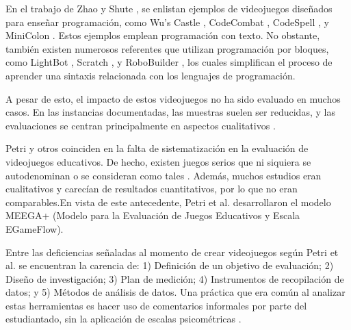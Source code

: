 

En el trabajo de Zhao y Shute \cite{video_game_foster_computational_thinking}, se enlistan ejemplos de videojuegos diseñados para enseñar programación, como Wu's Castle \cite{wuscastle}, CodeCombat \cite{CodeCombat}, CodeSpell \cite{codespells}, y MiniColon \cite{minicolon}. Estos ejemplos emplean programación con texto. No obstante, también existen numerosos referentes que utilizan programación por bloques, como LightBot \cite{LightBot}, Scratch \cite{ scratch, maloney2010scratch}, y RoboBuilder \cite{RoboBuilder}, los cuales simplifican el proceso de aprender una sintaxis relacionada con los lenguajes de programación.

A pesar de esto, el impacto de estos videojuegos no ha sido evaluado en muchos casos. En las instancias documentadas, las muestras suelen ser reducidas, y las evaluaciones se centran principalmente en aspectos cualitativos \cite{video_game_foster_computational_thinking, effectiveness_gbl}.

Petri y otros \cite{meegaplus} coinciden en la falta de sistematización en la evaluación de videojuegos educativos. De hecho, existen juegos serios que ni siquiera se autodenominan o se consideran como tales \cite{evaluation_of_games_for_teaching_cs}. Además, muchos estudios eran cualitativos y carecían de resultados cuantitativos, por lo que no eran comparables.En vista de este antecedente, Petri et al. \cite{meegaplus} desarrollaron el modelo MEEGA+ (Modelo para la Evaluación de Juegos Educativos y Escala EGameFlow).

Entre las deficiencias señaladas al momento de crear videojuegos según Petri et al. \cite{meegaplus} se encuentran la carencia de: 1) Definición de un objetivo de evaluación; 2) Diseño de investigación; 3) Plan de medición; 4) Instrumentos de recopilación de datos; y 5) Métodos de análisis de datos. Una práctica que era común al analizar estas herramientas es hacer uso de comentarios informales por parte del estudiantado, sin la aplicación de escalas psicométricas \cite{meegaplus}.
